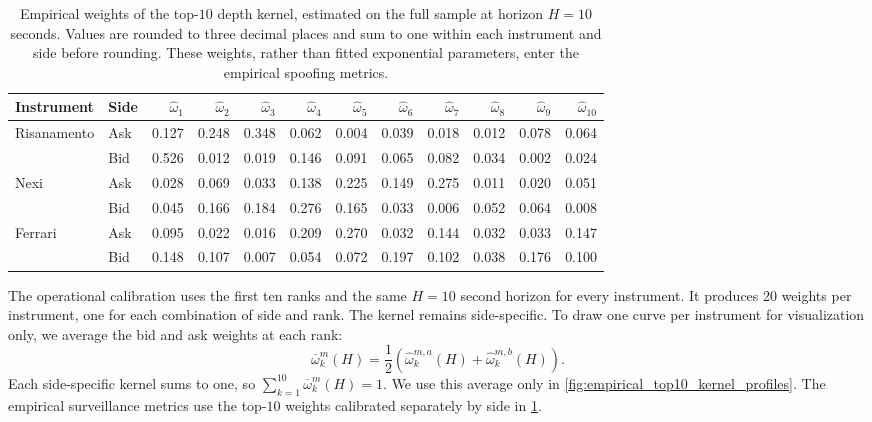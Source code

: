 \documentclass[11pt]{article}
\newenvironment{review}{\begingroup\color{blue}}{\endgroup}
\begin{document}
\begin{table}[htbp]
\centering
\caption{\begin{review}Empirical weights of the top-$10$ depth kernel, estimated on the full sample at horizon $H=10$ seconds.\end{review} Values are rounded to
three decimal places and sum to one within each instrument and side before rounding. These weights, rather than fitted
exponential parameters, enter the empirical spoofing metrics.}
\label{tab:empirical_depth_kernel_calibration}
\scriptsize
\setlength{\tabcolsep}{1.7pt}
\begin{tabular}{ll*{10}{r}}
\toprule
Instrument & Side & $\widehat\omega_1$ & $\widehat\omega_2$ & $\widehat\omega_3$ & $\widehat\omega_4$ & $\widehat\omega_5$ & $\widehat\omega_6$ & $\widehat\omega_7$ & $\widehat\omega_8$ & $\widehat\omega_9$ & $\widehat\omega_{10}$ \\
\midrule
Risanamento & Ask & 0.127 & 0.248 & 0.348 & 0.062 & 0.004 & 0.039 & 0.018 & 0.012 & 0.078 & 0.064 \\
             & Bid & 0.526 & 0.012 & 0.019 & 0.146 & 0.091 & 0.065 & 0.082 & 0.034 & 0.002 & 0.024 \\
Nexi        & Ask & 0.028 & 0.069 & 0.033 & 0.138 & 0.225 & 0.149 & 0.275 & 0.011 & 0.020 & 0.051 \\
             & Bid & 0.045 & 0.166 & 0.184 & 0.276 & 0.165 & 0.033 & 0.006 & 0.052 & 0.064 & 0.008 \\
Ferrari     & Ask & 0.095 & 0.022 & 0.016 & 0.209 & 0.270 & 0.032 & 0.144 & 0.032 & 0.033 & 0.147 \\
             & Bid & 0.148 & 0.107 & 0.007 & 0.054 & 0.072 & 0.197 & 0.102 & 0.038 & 0.176 & 0.100 \\
\bottomrule
\end{tabular}
\end{table}

The operational calibration uses the first ten ranks and the same $H=10$ second horizon for every instrument. It produces
20 weights per instrument, \begin{review}one for each combination of side and rank\end{review}. The kernel remains side-specific. To draw one curve per
instrument for visualization only, we average the bid and ask weights at each rank:
\begin{equation}
    \overline{\omega}^{m}_{k}(H)
    =
    \frac{1}{2}\left(
        \widehat\omega^{m,a}_{k}(H)
        +
        \widehat\omega^{m,b}_{k}(H)
    \right).
    \label{eq:side_averaged_empirical_kernel}
\end{equation}
Each side-specific kernel sums to one, so $\sum_{k=1}^{10}\overline{\omega}^{m}_{k}(H)=1$. We use this average only in
\cref{fig:empirical_top10_kernel_profiles}. The empirical surveillance metrics use \begin{review}the top-$10$ weights calibrated separately by side\end{review} in
\cref{tab:empirical_depth_kernel_calibration}.
\end{document}
